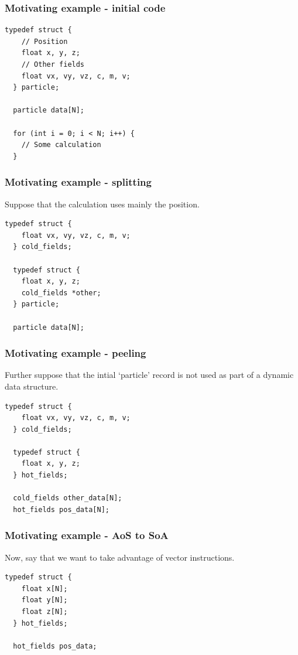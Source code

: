 \begin{frame}[fragile]
\frametitle{Motivating example - initial code}

\begin{lstlisting}[style=Cstyle]
  typedef struct {
    // Position
    float x, y, z;
    // Other fields
    float vx, vy, vz, c, m, v;
  } particle;
  
  particle data[N];
  
  for (int i = 0; i < N; i++) {
    // Some calculation
  }
\end{lstlisting}

\end{frame}


\begin{frame}[fragile]
\frametitle{Motivating example - splitting}

Suppose that the calculation uses mainly the position.

\bigskip

\begin{lstlisting}[style=Cstyle]
  typedef struct {
    float vx, vy, vz, c, m, v;
  } cold_fields;

  typedef struct {
    float x, y, z;
    cold_fields *other;
  } particle;
  
  particle data[N];
\end{lstlisting}

\end{frame}


\begin{frame}[fragile]
\frametitle{Motivating example - peeling}

Further suppose that the intial `particle' record is not used as part of a dynamic data structure.

\begin{lstlisting}[style=Cstyle]
  typedef struct {
    float vx, vy, vz, c, m, v;
  } cold_fields;

  typedef struct {
    float x, y, z;
  } hot_fields;

  cold_fields other_data[N];
  hot_fields pos_data[N];
\end{lstlisting}

\end{frame}


\begin{frame}[fragile]
\frametitle{Motivating example - AoS to SoA}

Now, say that we want to take advantage of vector instructions.

\bigskip

\begin{lstlisting}[style=Cstyle]
  typedef struct {
    float x[N]; 
    float y[N];
    float z[N];
  } hot_fields;

  hot_fields pos_data;
\end{lstlisting}

\end{frame}


